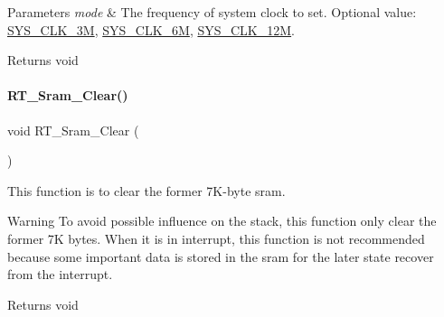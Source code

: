 \begin{DoxyParams}{Parameters}
{\em mode} & The frequency of system clock to set. Optional value\+: \mbox{\hyperlink{a00020_ae3a2d501b8662e11b969fb4a5e195e5baaac7754daa9ff2db35951f3539495122}{S\+Y\+S\+\_\+\+C\+L\+K\+\_\+3M}}, \mbox{\hyperlink{a00020_ae3a2d501b8662e11b969fb4a5e195e5bad1640aa8c46162a7551abca12293ef39}{S\+Y\+S\+\_\+\+C\+L\+K\+\_\+6M}}, \mbox{\hyperlink{a00020_ae3a2d501b8662e11b969fb4a5e195e5ba6c646c9a1e4c38ef0af6d576eacfb401}{S\+Y\+S\+\_\+\+C\+L\+K\+\_\+12M}}. \\
\hline
\end{DoxyParams}
\begin{DoxyReturn}{Returns}
void 
\end{DoxyReturn}
\mbox{\label{a00020_ad514417aa2e5a5d061a5eabeceae20c6}} 
\paragraph{\texorpdfstring{R\+T\+\_\+\+Sram\+\_\+\+Clear()}{RT\_Sram\_Clear()}}
{\footnotesize\ttfamily void R\+T\+\_\+\+Sram\+\_\+\+Clear (\begin{DoxyParamCaption}{ }\end{DoxyParamCaption})\hspace{0.3cm}{\ttfamily [inline]}}



This function is to clear the former 7\+K-\/byte sram. 

\begin{DoxyWarning}{Warning}
To avoid possible influence on the stack, this function only clear the former 7K bytes. When it is in interrupt, this function is not recommended because some important data is stored in the sram for the later state recover from the interrupt. 
\end{DoxyWarning}
\begin{DoxyReturn}{Returns}
void 
\end{DoxyReturn}
